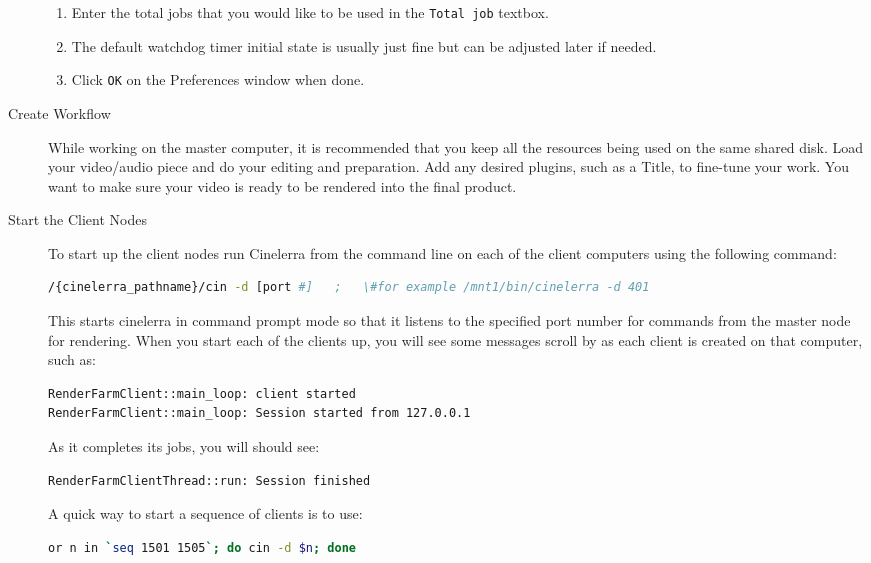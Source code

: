 \begin{description}
\begin{enumerate}
        \item Enter the total jobs that you would like to be used in the \texttt{Total job} textbox.
        \item The default watchdog timer initial state is usually just fine but can be adjusted later if needed.
        \item Click \texttt{OK} on the Preferences window when done.
    \end{enumerate}
    \item[Create Workflow] While working on the master computer, it is recommended that you keep all the resources being used on the same shared disk.  Load your video/audio piece and do your editing and preparation.  Add any desired plugins, such as a Title, to fine-tune your work.  You want to make sure your video is ready to be rendered into the final product.
    \item[Start the Client Nodes] To start up the client nodes run Cinelerra from the command line on each of the client computers using the following command:
    \begin{lstlisting}[language=bash,numbers=none]
/{cinelerra_pathname}/cin -d [port #]   ;   \#for example /mnt1/bin/cinelerra -d 401
    \end{lstlisting}
    This starts cinelerra in command prompt mode so that it listens to the specified port number for commands from the master node for rendering.  When you start each of the clients up, you will see some messages scroll by as each client is created on that computer, such as:
    \begin{lstlisting}[language=bash,numbers=none]
RenderFarmClient::main_loop: client started
RenderFarmClient::main_loop: Session started from 127.0.0.1
    \end{lstlisting}
    As it completes its jobs, you will should see:
    \begin{lstlisting}[language=bash,numbers=none]
RenderFarmClientThread::run: Session finished
    \end{lstlisting}
    A quick way to start a sequence of clients is to use:
    \begin{lstlisting}[language=bash,numbers=none]
or n in `seq 1501 1505`; do cin -d $n; done
    \end{lstlisting}

\end{description}
